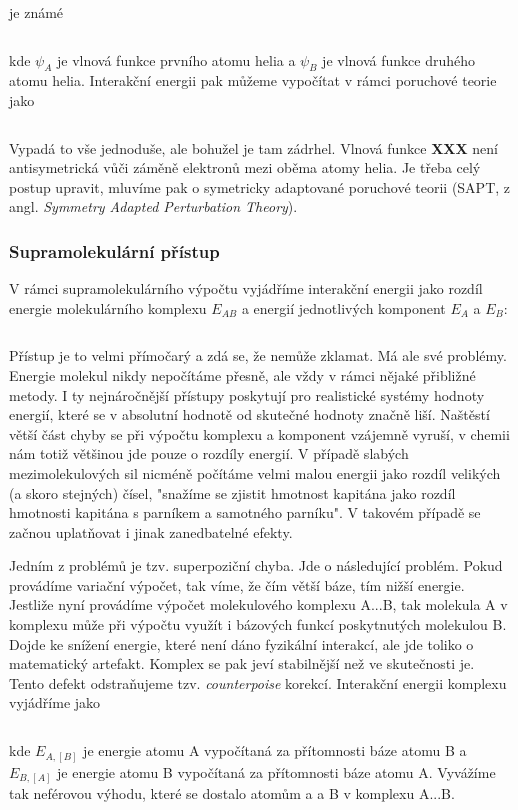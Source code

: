\noindent je známé


\begin{equation}
\label{rov:XXX}
\end{equation}


\noindent kde $\psi_A$ je vlnová funkce prvního atomu helia a $\psi_B$ je vlnová funkce druhého atomu helia. Interakční energii pak můžeme vypočítat v rámci poruchové teorie jako


\begin{equation}
\label{rov:XXX}
\end{equation}


Vypadá to vše jednoduše, ale bohužel je tam zádrhel. Vlnová funkce \textbf{XXX} není antisymetrická vůči záměně elektronů mezi oběma atomy helia. Je třeba celý postup upravit, mluvíme pak o symetricky adaptované poruchové teorii (SAPT, z angl. \textit{Symmetry Adapted Perturbation Theory}). 


\subsubsection{Supramolekulární přístup}
V rámci supramolekulárního výpočtu vyjádříme interakční energii jako rozdíl energie molekulárního komplexu $E_{AB}$ a energií jednotlivých komponent $E_A$ a $E_B$:

\begin{equation}
\label{rov:XXX}
\end{equation}


Přístup je to velmi přímočarý a zdá se, že nemůže zklamat. Má ale své problémy. Energie molekul nikdy nepočítáme přesně, ale vždy v rámci nějaké přibližné metody. I ty nejnáročnější přístupy poskytují pro realistické systémy hodnoty energií, které se v absolutní hodnotě od skutečné hodnoty značně liší. Naštěstí větší část chyby se při výpočtu komplexu a komponent vzájemně vyruší, v chemii nám totiž většinou jde pouze o rozdíly energií. V případě slabých mezimolekulových sil nicméně počítáme velmi malou energii jako rozdíl velikých (a skoro stejných) čísel, "snažíme se zjistit hmotnost kapitána jako rozdíl hmotnosti kapitána s parníkem a samotného parníku". V takovém případě se začnou uplatňovat i jinak zanedbatelné efekty.

Jedním z problémů je tzv. superpoziční chyba. Jde o následující problém. Pokud provádíme variační výpočet, tak  víme, že čím větší báze, tím nižší energie. Jestliže nyní provádíme výpočet molekulového komplexu A...B, tak molekula A v komplexu může při výpočtu využít i bázových funkcí poskytnutých molekulou B. Dojde ke snížení energie, které není dáno fyzikální interakcí, ale jde toliko o matematický artefakt. Komplex se pak jeví stabilnější než ve skutečnosti je. Tento defekt odstraňujeme tzv. \textit{counterpoise} korekcí. Interakční energii komplexu vyjádříme jako 

\begin{equation}
\label{rov:XXX}
\end{equation}

\noindent kde $E_{A,{[B]}}$ je energie atomu A vypočítaná za přítomnosti báze atomu B a $E_{B,{[A]}}$ je energie atomu B vypočítaná za přítomnosti báze atomu A. Vyvážíme tak neférovou výhodu, které se dostalo atomům a a B v komplexu A...B.
